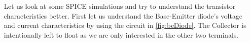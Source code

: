 Let us look at some SPICE simulations and try to understand the transistor characteristics better. First let us understand the Base-Emitter diode's voltage and current characteristics by using the circuit in \autoref{fig:beDiode}. The Collector is intentionally left to float as we are only interested in the other two terminals. 

	\begin{figure}[h!]
		\centering
\end{figure}
